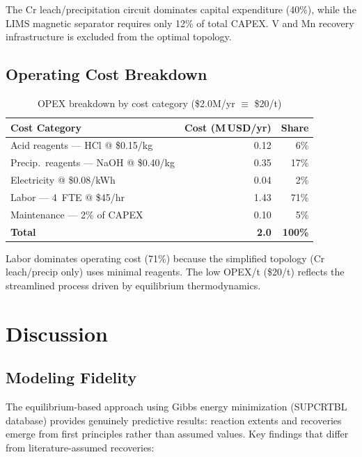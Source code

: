 \documentclass[11pt,a4paper]{article}
\begin{document}
\noindent The Cr leach/precipitation circuit dominates capital expenditure (40\%),
while the LIMS magnetic separator requires only 12\% of total CAPEX.
V and Mn recovery infrastructure is excluded from the optimal topology.

\subsection{Operating Cost Breakdown}

\begin{table}[H]
\centering
\caption{OPEX breakdown by cost category (\$2.0M/yr $\equiv$ \$20/t)}
\label{tab:opex}
\begin{tabular}{@{}lrr@{}}
\toprule
\textbf{Cost Category} & \textbf{Cost (M\,USD/yr)} & \textbf{Share} \\
\midrule
Acid reagents --- HCl @ \$0.15/kg      & 0.12 & 6\% \\
Precip.\ reagents --- NaOH @ \$0.40/kg  & 0.35 & 17\% \\
Electricity @ \$0.08/kWh               & 0.04 & 2\% \\
Labor --- 4~FTE @ \$45/hr              & 1.43 & 71\% \\
Maintenance --- 2\% of CAPEX            & 0.10 & 5\% \\
\midrule
\textbf{Total}                         & \textbf{2.0} & \textbf{100\%} \\
\bottomrule
\end{tabular}
\end{table}

\noindent Labor dominates operating cost (71\%) because the simplified
topology (Cr leach/precip only) uses minimal reagents. The low OPEX/t
(\$20/t) reflects the streamlined process driven by equilibrium
thermodynamics.

\section{Discussion}

\subsection{Modeling Fidelity}

The equilibrium-based approach using Gibbs energy minimization (SUPCRTBL
database) provides genuinely predictive results: reaction extents and
recoveries emerge from first principles rather than assumed values.
Key findings that differ from literature-assumed recoveries:
\end{document}
